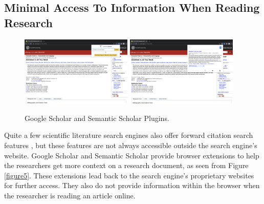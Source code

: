 \subsection{Minimal Access To Information When Reading Research}

\begin{figure}[h]
    \includegraphics[width=0.475\textwidth]{src/images/gg-plugin.png}
    \hfill
    \includegraphics[width=0.475\textwidth]{src/images/ss-plugin.png}
    \caption{ Google Scholar and Semantic Scholar Plugins. }
    \label{figure\arabic{figurecounter}}
\end{figure}
Quite a few scientific literature search engines also offer forward citation search features \parencite{gusenbauer2020academic}, but these features are not always accessible outside the search engine’s website. 
Google Scholar and Semantic Scholar provide browser extensions to help the researchers get more context on a research document, as seen from Figure \ref{figure5}. 
These extensions lead back to the search engine's proprietary websites for further access. They also do not provide information within the browser when the researcher is reading an article online. 
